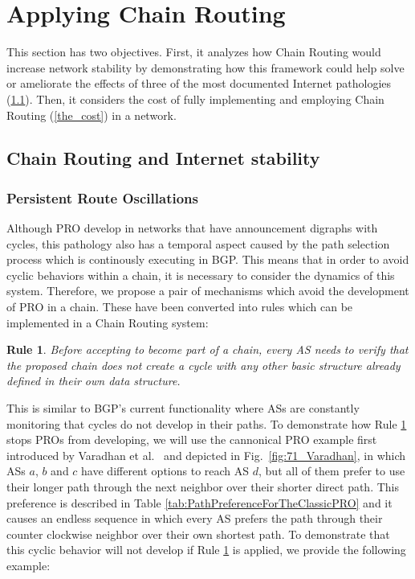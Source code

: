 \documentclass[5p,twocolumn]{elsarticle}
\newtheorem{Rule}{Rule}
\begin{document}
\section{Applying Chain Routing}\label{applying}

This section has two objectives. First, it analyzes how Chain Routing would increase network stability by demonstrating how this framework could help solve or ameliorate the effects of three of the most documented Internet pathologies (\ref{internet_stability}). Then, it considers the cost of fully implementing and employing Chain Routing (\ref{the_cost}) in a network.


\subsection{Chain Routing and Internet stability}\label{internet_stability}


\subsubsection{Persistent Route Oscillations}\label{is_pro}

Although PRO \cite{Varadhan1996} develop in networks that have announcement digraphs with cycles, this pathology also has a temporal aspect caused by the path selection process which is continously executing in BGP. This means that in order to avoid cyclic behaviors within a chain, it is necessary to consider the dynamics of this system. Therefore, we propose a pair of mechanisms which avoid the development of PRO in a chain. These have been converted into rules which can be implemented in a Chain Routing system:

\begin{Rule}\label{R:David01}
Before accepting to become part of a chain, every AS needs to verify that the proposed chain does not create a cycle with any other basic structure already defined in their own data structure.
\end{Rule}

This is similar to BGP's current functionality where ASs are constantly monitoring that cycles do not develop in their paths. To demonstrate how Rule \ref{R:David01} stops PROs from developing, we will use the cannonical PRO example first introduced by Varadhan et al.\ \cite{Varadhan1996} and depicted in Fig.\ \ref{fig:71_Varadhan}, in which ASs $a$, $b$ and $c$ have different options to reach AS $d$, but all of them prefer to use their longer path through the next neighbor over their shorter direct path. This preference is described in Table \ref{tab:PathPreferenceForTheClassicPRO} and it causes an endless sequence in which every AS prefers the path through their counter clockwise neighbor over their own shortest path. To demonstrate that this cyclic behavior will not develop if Rule \ref{R:David01} is applied, we provide the following example:
\end{document}
